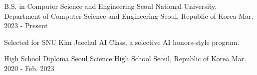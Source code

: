 

\begin{cventries}

  \cventry
    {B.S. in Computer Science and Engineering} %
    {Seoul National University, Department of Computer Science and Engineering} %
    {Seoul, Republic of Korea} %
    {Mar. 2023 - Present} %
    {
      \begin{cvitems} %
        \item {Selected for SNU Kim Jaechul AI Class, a selective AI honors-style program.}
      \end{cvitems}
    }

  \cventry
    {High School Diploma}
    {Seoul Science High School}
    {Seoul, Republic of Korea}
    {Mar. 2020 - Feb. 2023}
    {
    }

\end{cventries}
